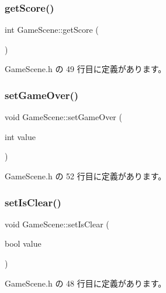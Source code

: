 \subsubsection{\texorpdfstring{get\+Score()}{getScore()}}
{\footnotesize\ttfamily int Game\+Scene\+::get\+Score (\begin{DoxyParamCaption}{ }\end{DoxyParamCaption})\hspace{0.3cm}{\ttfamily [inline]}}



 Game\+Scene.\+h の 49 行目に定義があります。

\mbox{\label{class_game_scene_abaefc8ae1bd5625d79da25120ef33a8e}} 
\subsubsection{\texorpdfstring{set\+Game\+Over()}{setGameOver()}}
{\footnotesize\ttfamily void Game\+Scene\+::set\+Game\+Over (\begin{DoxyParamCaption}\item[{int}]{value }\end{DoxyParamCaption})\hspace{0.3cm}{\ttfamily [inline]}}



 Game\+Scene.\+h の 52 行目に定義があります。

\mbox{\label{class_game_scene_a1bd84ecb8d44bd5e57b4a2d772ef1bf9}} 
\subsubsection{\texorpdfstring{set\+Is\+Clear()}{setIsClear()}}
{\footnotesize\ttfamily void Game\+Scene\+::set\+Is\+Clear (\begin{DoxyParamCaption}\item[{bool}]{value }\end{DoxyParamCaption})\hspace{0.3cm}{\ttfamily [inline]}}



 Game\+Scene.\+h の 48 行目に定義があります。

